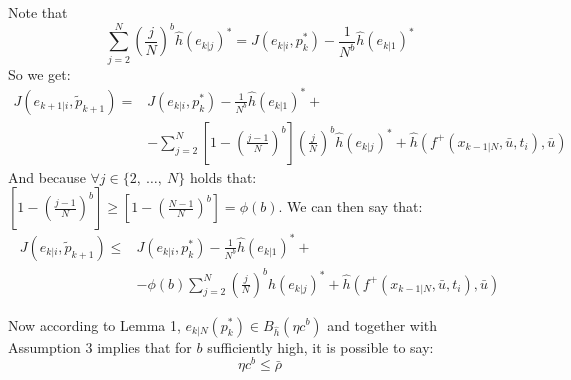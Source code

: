 Note that 
\begin{equation*}
	\sum_{j=2}^{N}\left(\frac{j}{N}\right)^b \hat{h}(e_{k|j})^*=J({e}_{k|i},p_{k}^*)-\frac{1}{N^b}\hat{h}(e_{k|1})^*
\end{equation*}
So we get:
\begin{equation*}
    \begin{split}
        J({e}_{k+1|i},\tilde{p}_{k+1})=&J({e}_{k|i},p_{k}^*)-\frac{1}{N^b}\hat{h}(e_{k|1})^*+ \\ 
        &-\sum_{j=2}^{N}\left[1-\left(\frac{j-1}{N}\right)^b\right]\left(\frac{j}{N}\right)^b \hat{h}(e_{k|j})^*+ \hat{h}\left(f^+(x_{k-1|N},\bar{u},t_i),\bar{u}\right)
    \end{split}
\end{equation*}
And because $\forall j \in \lbrace2,\ \dots,\ N\rbrace$ holds that: 
$\left[ 1-\left(\frac{j-1}{N}\right)^b \right]\ge\left[ 1-\left(\frac{N-1}{N}\right)^b \right]= \phi(b)$. We can then say that: 
\begin{equation}\label{dim1}
    \begin{split}
        J({e}_{k|i},\tilde{p}_{k+1})\le &J({e}_{k|i},p_{k}^*) - \frac{1}{N^b}\hat{h}(e_{k|1})^*+ \\ 
        &-\phi(b)\sum_{j=2}^{N}\left(\frac{j}{N}\right)^b h(e_{k|j})^*+ \hat{h}\left(f^+(x_{k-1|N},\bar{u},t_i),\bar{u}\right)
    \end{split}
\end{equation}

Now according to Lemma 1, $e_{k|N}(p_k^*) \in B_{\hat{h}}(\eta c^b)$ and together with Assumption 3 implies that for $b$ sufficiently high, it is possible to say:
\begin{equation}
\eta c^b \leq \bar{\rho}
\end{equation}

